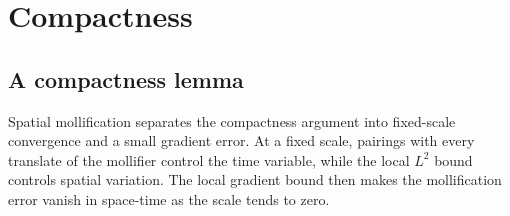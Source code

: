 \documentclass[11pt,reqno]{amsart}
\begin{document}
\section{Compactness}\label{sec:compactness}

\subsection{A compactness lemma}\label{subsec:compactness}

Spatial mollification separates the compactness argument into fixed-scale convergence and a small gradient error. At a fixed scale, pairings with every translate of the mollifier control the time variable, while the local $L^2$ bound controls spatial variation. The local gradient bound then makes the mollification error vanish in space-time as the scale tends to zero.
\end{document}
